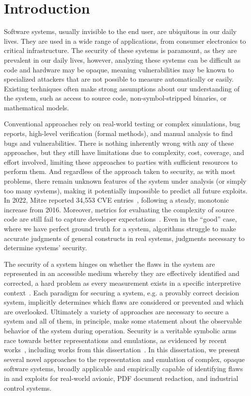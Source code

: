 \chapter{Introduction}

Software systems, usually invisible to the end user, are ubiquitous in our daily lives.
They are used in a wide range of applications, from consumer electronics to critical infrastructure.
The security of these systems is paramount, as they are prevalent in our daily lives, however, analyzing these systems can be difficult as code and hardware may be opaque, meaning vulnerabilities may be known to specialized attackers that are not possible to measure automatically or easily.
Existing techniques often make strong assumptions about our understanding of the system, such as access to source code, non-symbol-stripped binaries, or mathematical models.

Conventional approaches rely on real-world testing or complex simulations, bug reports, high-level verification (formal methods), and manual analysis to find bugs and vulnerabilities.
There is nothing inherently wrong with any of these approaches, but they still have limitations due to complexity, cost, coverage, and effort involved, limiting these approaches to parties with sufficient resources to perform them.
And regardless of the approach taken to security, as with most problems, there remain unknown features of the system under analysis (or simply too many systems), making it potentially impossible to predict all future exploits.
In 2022, Mitre reported 34,553 CVE entries~\cite{mitre2022}, following a steady, monotonic increase from 2016.
Moreover, metrics for evaluating the complexity of source code are still fail to capture developer expectations~\cite{pantiuchina2018improving, feigenspan2011exploring, feitelson2023code}.
Even in the ``good'' case, where we have perfect ground truth for a system, algorithms struggle to make accurate judgments of general constructs in real systems, judgments necessary to determine systems' security.

The security of a system hinges on whether the flaws in the system are represented in an accessible medium whereby they are effectively identified and corrected, a hard problem as every measurement exists in a specific interpretive context~\cite{stolfo2011measuring}.
Each paradigm for securing a system, e.g. a provably correct decision system, implicitly determines which flaws are considered or prevented and which are overlooked.
Ultimately a variety of approaches are necessary to secure a system and all of them, in principle, make some statement about the observable behavior of the system during operation.
Security is a veritable symbolic arms race towards better representations and emulations, as evidenced by recent works~\cite{shoshitaishvili2016sok, arp2022and, chen2022metaemu}, including works from this dissertation~\cite{johnson2021jetset, bland2023story, bland2023integreat}.
In this dissertation, we present several novel approaches to the representation and emulation of complex, opaque software systems, broadly applicable and empirically capable of identifying flaws in and exploits for real-world avionic, PDF document redaction, and industrial control systems.

